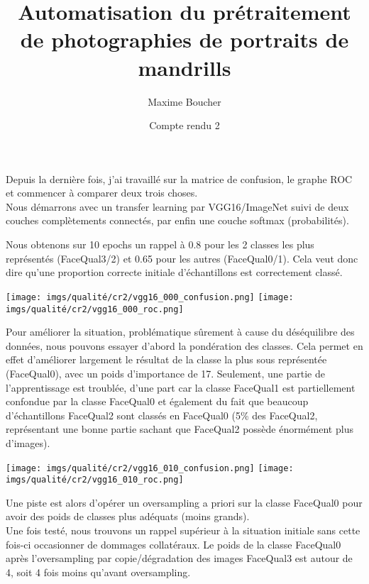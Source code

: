 \documentclass{article}
\title{Automatisation du prétraitement de photographies de portraits de mandrills}
\author{Maxime Boucher}
\date{Compte rendu 2}
\begin{document}
\maketitle

Depuis la dernière fois, j'ai travaillé sur la matrice de confusion, le graphe ROC et commencer à comparer deux trois choses.\\

Nous démarrons avec un transfer learning par VGG16/ImageNet suivi de deux couches complètements connectés, par enfin une couche softmax (probabilités).

Nous obtenons sur 10 epochs un rappel à 0.8 pour les 2 classes les plus représentés (FaceQual3/2) et 0.65 pour les autres (FaceQual0/1). Cela veut donc dire qu'une proportion correcte initiale d'échantillons est correctement classé.

\begin{center}
    \texttt{[image: imgs/qualité/cr2/vgg16\_000\_confusion.png]}
    \texttt{[image: imgs/qualité/cr2/vgg16\_000\_roc.png]}
\end{center}

Pour améliorer la situation, problématique sûrement à cause du déséquilibre des données, nous pouvons essayer d'abord la pondération des classes. Cela permet en effet d'améliorer largement le résultat de la classe la plus sous représentée (FaceQual0), avec un poids d'importance de 17. Seulement, une partie de l'apprentissage est troublée, d'une part car la classe FaceQual1 est partiellement confondue par la classe FaceQual0 et également du fait que beaucoup d'échantillons FaceQual2 sont classés en FaceQual0 (5\% des FaceQual2, représentant une bonne partie sachant que FaceQual2 possède énormément plus d'images).


\begin{center}
    \texttt{[image: imgs/qualité/cr2/vgg16\_010\_confusion.png]}
    \texttt{[image: imgs/qualité/cr2/vgg16\_010\_roc.png]}
\end{center}

Une piste est alors d'opérer un oversampling a priori sur la classe FaceQual0 pour avoir des poids de classes plus adéquats (moins grands). \\

Une fois testé, nous trouvons un rappel supérieur à la situation initiale sans cette fois-ci occasionner de dommages collatéraux. Le poids de la classe FaceQual0 après l'oversampling par copie/dégradation des images FaceQual3 est autour de 4, soit 4 fois moins qu'avant oversampling.
\end{document}
